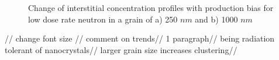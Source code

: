 \documentclass[a4paper]{article}
\begin{document}
    \begin{figure}[htb!]  %
      \centering
      \qquad
      \caption{Change of interstitial concentration profiles with production bias for low dose rate neutron in a grain of a) 250 $nm$ and b) 1000 $nm$ }
      \label{figure:3D_concentrations_neutron_1e-6}
    \end{figure}

//
change font size //
comment on trends//
1 paragraph//
being radiation tolerant of nanocrystals//
larger grain size increases clustering//
\end{document}

